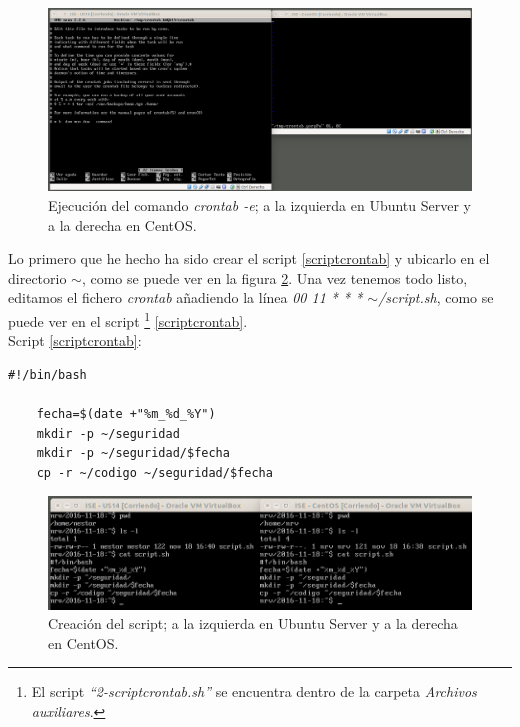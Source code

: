 \documentclass[a4paper,titlepage,12pt]{scrartcl}	%
\numberwithin{figure}{section} %
\numberwithin{table}{section} %
\begin{document}
	\begin{figure}[H]
		\includegraphics[width=\linewidth]{./Imagenes/2-crontab-e.png}
		\vspace{-0.5cm}
		\caption[Ejecución del comando \textit{crontab -e}; a la izquierda en Ubuntu Server y a la derecha en CentOS.]{Ejecución del comando \textit{crontab -e}; a la izquierda en Ubuntu Server y a la derecha en CentOS.}
		\label{2-crontab-e}
	\end{figure}

	Lo primero que he hecho ha sido crear el script \ref{scriptcrontab} y ubicarlo en el directorio \textit{$\sim$}, como se puede ver en la figura \ref{2-script}. Una vez tenemos todo listo, editamos el fichero \textit{crontab} añadiendo la línea \textit{00 11 * * * $\sim$/script.sh}, como se puede ver en el script \footnote{El script \textit{``2-scriptcrontab.sh''} se encuentra dentro de la carpeta \textit{Archivos auxiliares}.} \ref{scriptcrontab}. \\
	
	Script \ref{scriptcrontab}:
	\begin{lstlisting}[frame=single, basicstyle=\footnotesize, label={scriptcrontab}]
	#!/bin/bash
	
	fecha=$(date +"%m_%d_%Y")
	mkdir -p ~/seguridad
	mkdir -p ~/seguridad/$fecha
	cp -r ~/codigo ~/seguridad/$fecha
	\end{lstlisting}
	
	\begin{figure}[H]
		\includegraphics[width=\linewidth]{./Imagenes/2-script.png}
		\vspace{-0.5cm}
		\caption[Creación del script; a la izquierda en Ubuntu Server y a la derecha en CentOS.]{Creación del script; a la izquierda en Ubuntu Server y a la derecha en CentOS.}
		\label{2-script}
	\end{figure}
	
\end{document}
